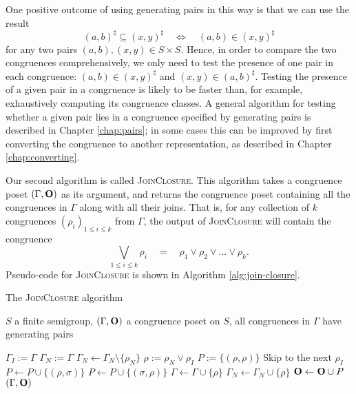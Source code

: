 One positive outcome of using generating pairs in this way is that we can use
the result
$$(a,b)^\sharp \subseteq (x,y)^\sharp \quad\iff\quad (a,b) \in (x,y)^\sharp$$
for any two pairs $(a,b), (x,y) \in S \times S$.  Hence, in order to compare the
two congruences comprehensively, we only need to test the presence of one pair
in each congruence: $(a,b) \in (x,y)^\sharp$ and $(x,y) \in (a,b)^\sharp$.
Testing the presence of a given pair in a congruence is likely to be faster
than, for example, exhaustively computing its congruence classes.  A general
algorithm for testing whether a given pair lies in a congruence specified by
generating pairs is described in Chapter \ref{chap:pairs}; in some cases this
can be improved by first converting the congruence to another representation, as
described in Chapter \ref{chap:converting}.

Our second algorithm is called \textsc{JoinClosure}.  This algorithm takes a
congruence poset $(\Gamma, \mathbf{O})$ as its argument, and returns the congruence
poset containing all the congruences in $\Gamma$ along with all their joins.
That is, for any collection of $k$ congruences
$(\rho_i)_{1 \leq i \leq k}$ from $\Gamma$, the output of
\textsc{JoinClosure} will contain the congruence
$$\bigvee_{1 \leq i \leq k} \rho_i
\quad=\quad \rho_1 \vee \rho_2 \vee \ldots \vee \rho_k.$$
Pseudo-code for \textsc{JoinClosure} is shown in Algorithm
\ref{alg:join-closure}.

\begin{algorithm}
  \caption{The \textsc{JoinClosure} algorithm}
  \label{alg:join-closure}
  \begin{algorithmic}[1]
    \Require
    $S$ a finite semigroup,
    $(\Gamma,\mathbf{O})$ a congruence poset on $S$,
    all congruences in $\Gamma$ have generating pairs
    
      \State $\Gamma_I := \Gamma$ 
      \State $\Gamma_N := \Gamma$ 
          \State $\Gamma_N \gets \Gamma_N \setminus \{\rho_N\}$
            \State $\rho := \rho_N \vee \rho_I$
            \State $P := \{(\rho, \rho)\}$
            \For{$\sigma \in \Gamma$}
              \If{$\rho \subseteq \sigma$}
                \If{$\sigma \subseteq \rho$}
                  \State Skip to the next $\rho_I$
                  \Comment{$\rho = \sigma$}
                \Else
                  \State $P \gets P \cup \{(\rho, \sigma)\}$
                \EndIf
              \ElsIf{$\sigma \subseteq \rho$}
                \State $P \gets P \cup \{(\sigma, \rho)\}$
              \EndIf
            \EndFor
            \State $\Gamma \gets \Gamma \cup \{\rho\}$
            \State $\Gamma_N \gets \Gamma_N \cup \{\rho\}$
            \State $\mathbf{O} \gets \mathbf{O} \cup P$
          \EndFor
        \EndFor
      \EndWhile
      \State \Return $(\Gamma, \mathbf{O})$
    \EndProcedure
  \end{algorithmic}
\end{algorithm}

